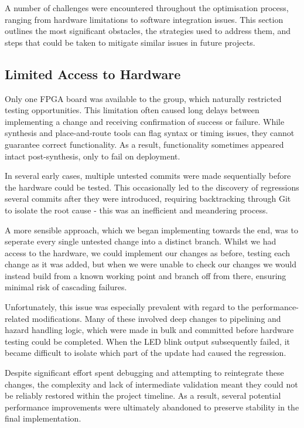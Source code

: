 \documentclass[a4paper,10pt]{article}
\begin{document}
A number of challenges were encountered throughout the optimisation process, 
ranging from hardware limitations to software integration issues. 
This section outlines the most significant obstacles, 
the strategies used to address them, 
and steps that could be taken to mitigate similar issues in future projects.

\subsection*{Limited Access to Hardware}

Only one FPGA board was available to the group, 
which naturally restricted testing opportunities. 
This limitation often caused long delays between 
implementing a change and receiving confirmation of success or failure. 
While synthesis and place-and-route tools can flag syntax or timing issues, 
they cannot guarantee correct functionality. 
As a result, functionality sometimes appeared intact post-synthesis, 
only to fail on deployment. 

In several early cases, multiple untested commits were made sequentially 
before the hardware could be tested. 
This occasionally led to the discovery of regressions several commits 
after they were introduced, requiring backtracking through Git 
to isolate the root cause - 
this was an inefficient and meandering process.

A more sensible approach, which we began implementing towards the end,
was to seperate every single untested change into a distinct branch.
Whilst we had access to the hardware, we could implement our changes as before,
testing each change as it was added,
but when we were unable to check our changes 
we would instead build from a known working point and branch off from there, 
ensuring minimal risk of cascading failures.

Unfortunately, this issue was especially prevalent with regard to the 
performance-related modifications. Many of these involved deep changes 
to pipelining and hazard handling logic, which were made in bulk 
and committed before hardware testing could be completed. 
When the LED blink output subsequently failed, it became difficult 
to isolate which part of the update had caused the regression. 

Despite significant effort spent debugging and attempting to reintegrate 
these changes, the complexity and lack of intermediate validation 
meant they could not be reliably restored within the project timeline. 
As a result, several potential performance improvements were ultimately 
abandoned to preserve stability in the final implementation.
\end{document}
